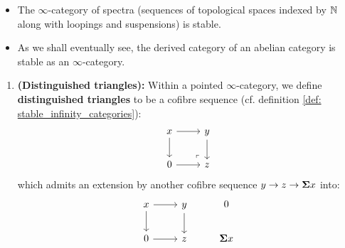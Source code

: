                 \begin{example}
                    \noindent
                    \begin{itemize}
                        \item The $\infty$-category of spectra (sequences of topological spaces indexed by $\mathbb{N}$ along with loopings and suspensions) is stable.
                        \item As we shall eventually see, the derived category of an abelian category is stable as an $\infty$-category.
                    \end{itemize}
                \end{example}
                
                \begin{definition} \label{def: triangulated_infinity_categories} 
                    \noindent
                    \begin{enumerate}
                        \item \textbf{(Distinguished triangles):} Within a pointed $\infty$-category, we define \textbf{distinguished triangles} to be a cofibre sequence (cf. definition \ref{def: stable_infinity_categories}):
                            $$
                                \begin{tikzcd}
                                	x & y \\
                                	0 & z
                                	\arrow[from=1-1, to=2-1]
                                	\arrow[from=1-1, to=1-2]
                                	\arrow[from=1-2, to=2-2]
                                	\arrow[from=2-1, to=2-2]
                                	\arrow["\lrcorner"{anchor=center, pos=0.125, rotate=180}, draw=none, from=2-2, to=1-1]
                                \end{tikzcd}
                            $$
                        which admits an extension by another cofibre sequence $y \to z \to \suspension x$ into:
                            $$
                                \begin{tikzcd}
                                	x & y & 0 \\
                                	0 & z & {\suspension x}
                                	\arrow[from=1-1, to=2-1]
                                	\arrow[from=1-1, to=1-2]
                                	\arrow[from=1-2, to=2-2]
                                	\arrow[from=2-1, to=2-2]

\end{tikzcd}$$
\end{enumerate}
\end{definition}
